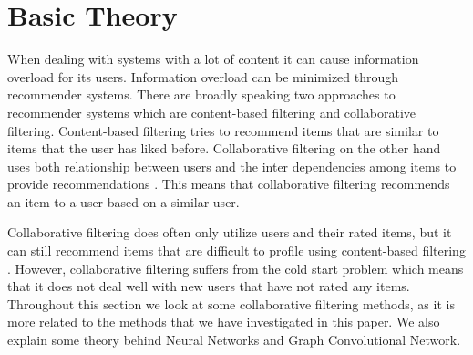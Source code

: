 \section{Basic Theory}

When dealing with systems with a lot of content it can cause information overload for its users.
Information overload can be minimized through recommender systems.
There are broadly speaking two approaches to recommender systems which are content-based filtering and collaborative filtering.
Content-based filtering tries to recommend items that are similar to items that the user has liked before.
Collaborative filtering on the other hand uses both relationship between users and the inter dependencies among items to provide recommendations \cite{Matrix-factorization-techniques}.
This means that collaborative filtering recommends an item to a user based on a similar user.

Collaborative filtering does often only utilize users and their rated items, but it can still recommend items that are difficult to profile using content-based filtering \cite{Matrix-factorization-techniques}.
However, collaborative filtering suffers from the cold start problem which means that it does not deal well with new users that have not rated any items.
Throughout this section we look at some collaborative filtering methods, as it is more related to the methods that we have investigated in this paper.
We also explain some theory behind Neural Networks and Graph Convolutional Network.

